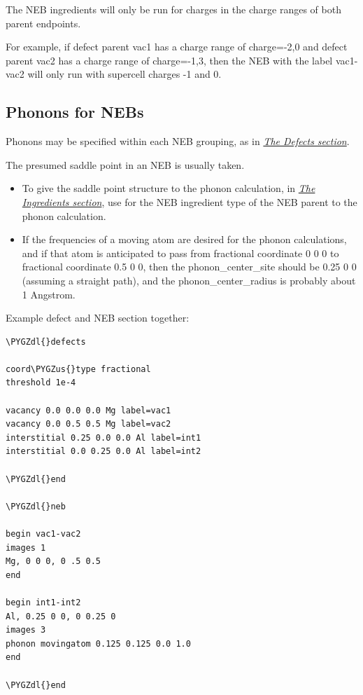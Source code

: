 \documentclass[letterpaper,10pt,english]{sphinxmanual}
\def\PYGZus{\char`\_}
\def\PYGZdl{\char`\$}
\begin{document}
The NEB ingredients will only be run for charges in the charge ranges of both parent endpoints.

For example, if defect parent vac1 has a charge range of charge=-2,0 and defect parent vac2 has a charge range of charge=-1,3, then the NEB with the label vac1-vac2 will only run with supercell charges -1 and 0.


\subsection{Phonons for NEBs}
\label{3_1_6_neb:phonons-for-nebs}
Phonons may be specified within each NEB grouping, as in {\hyperref[3_1_5_defects::doc]{\emph{The Defects section}}}.

The presumed saddle point in an NEB is usually taken.
\begin{itemize}
\item {} 
To give the saddle point structure to the phonon calculation, in {\hyperref[3_1_2_ingredients::doc]{\emph{The Ingredients section}}}, use  for the NEB ingredient type of the NEB parent to the phonon calculation.

\item {} 
If the frequencies of a moving atom are desired for the phonon calculations, and if that atom is anticipated to pass from fractional coordinate 0 0 0 to fractional coordinate 0.5 0 0, then the phonon\_center\_site should be 0.25 0 0 (assuming a straight path), and the phonon\_center\_radius is probably about 1 Angstrom.

\end{itemize}

Example defect and NEB section together:

\begin{Verbatim}[commandchars=\\\{\}]
\PYGZdl{}defects

coord\PYGZus{}type fractional
threshold 1e-4

vacancy 0.0 0.0 0.0 Mg label=vac1
vacancy 0.0 0.5 0.5 Mg label=vac2
interstitial 0.25 0.0 0.0 Al label=int1
interstitial 0.0 0.25 0.0 Al label=int2

\PYGZdl{}end

\PYGZdl{}neb

begin vac1-vac2
images 1
Mg, 0 0 0, 0 .5 0.5
end

begin int1-int2
Al, 0.25 0 0, 0 0.25 0
images 3
phonon movingatom 0.125 0.125 0.0 1.0
end

\PYGZdl{}end
\end{Verbatim}
\end{document}
